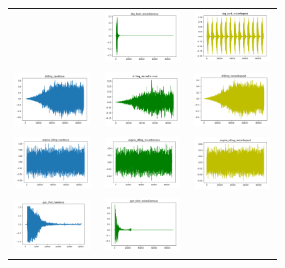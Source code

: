 \documentclass{article}
\begin{document}
\begin{figure}[!htb]
\begin{tabular}{ccc}
        &\includegraphics[width=2cm]{pic/DB_RSD.png}
        &\includegraphics[width=2cm]{pic/DB_RSRP.png}\\
        \includegraphics[width=2cm]{pic/DL_RW.png}
        &\includegraphics[width=2cm]{pic/DL_RSD.png}
        &\includegraphics[width=2cm]{pic/DL_RSRP.png}\\
        \includegraphics[width=2cm]{pic/EI_RW.png}
        &\includegraphics[width=2cm]{pic/EI_RSD.png}
        &\includegraphics[width=2cm]{pic/EI_RSRP.png}\\
        \includegraphics[width=2cm]{pic/GS_RW.png}
        &\includegraphics[width=2cm]{pic/GS_RSD.png}

\end{tabular}
\end{figure}
\end{document}
